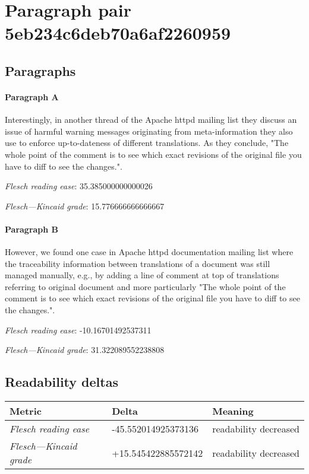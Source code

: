 \section{Paragraph pair 5eb234c6deb70a6af2260959}
\subsection{Paragraphs}
\paragraph{Paragraph A}
Interestingly, in another thread of the Apache httpd mailing list they discuss an issue of harmful warning messages originating from meta-information they also use to enforce up-to-dateness of different translations. As they conclude, "The whole point of the comment is to see which exact revisions of the original file you have to diff to see the changes.".\par\medskip\emph{Flesch reading ease}: 35.385000000000026\par\emph{Flesch---Kincaid grade}: 15.776666666666667

\paragraph{Paragraph B}
However, we found one case in Apache httpd documentation mailing list where the traceability information between translations of a document was still managed manually, e.g., by adding a line of comment at top of translations referring to original document and more particularly "The whole point of the comment is to see which exact revisions of the original file you have to diff to see the changes.".\par\medskip\emph{Flesch reading ease}: -10.16701492537311\par\emph{Flesch---Kincaid grade}: 31.322089552238808

\subsection{Readability deltas}

\begin{tabular}{lll}
\toprule
               \textbf{Metric} &       \textbf{Delta} &       \textbf{Meaning} \\
\midrule
    \emph{Flesch reading ease} &  -45.552014925373136 &  readability decreased \\
 \emph{Flesch---Kincaid grade} &  +15.545422885572142 &  readability decreased \\
\bottomrule
\end{tabular}

